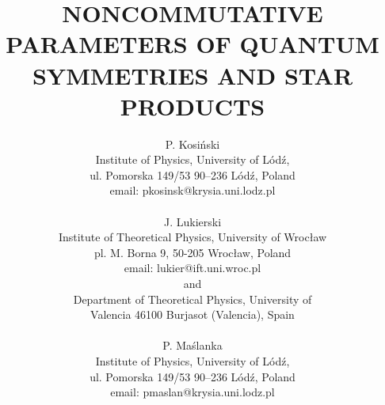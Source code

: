 \documentclass[a4paper,12pt]{article}
\begin{document}
\title{NONCOMMUTATIVE PARAMETERS OF QUANTUM 
SYMMETRIES AND STAR PRODUCTS}
 \author{P. Kosi\'{n}ski                                                                
                        \\                                                              
           Institute of Physics,                                                        
           University of L\'{o}d\'{z},                                                  
 \\ ul. Pomorska 149/53 90--236                                                    
                L\'{o}d\'{z},   Poland \\                                                   
 email: pkosinsk@krysia.uni.lodz.pl    
\\  \\   J. Lukierski
 \\          Institute of Theoretical Physics,        
 University of Wroc\l aw \\                                                             
   pl. M. Borna 9,                                                                      
           50-205 Wroc\l aw, Poland  \\                                             
     email: lukier@ift.uni.wroc.pl \\                                                  
      and \\                                                                                 
           Department of Theoretical Physics, University of \\              
    Valencia    46100 Burjasot (Valencia), Spain                              
               \\ \\                                                                              
     P.  Ma\'{s}lanka     \\                                                               
    Institute of                                                                           
        Physics, University of L\'{o}d\'{z},                                          
  \\ ul. Pomorska 149/53                                                               
         90--236 L\'{o}d\'{z}, Poland\\                                                 
 email: pmaslan@krysia.uni.lodz.pl    }                                          
                                             
\end{document}
